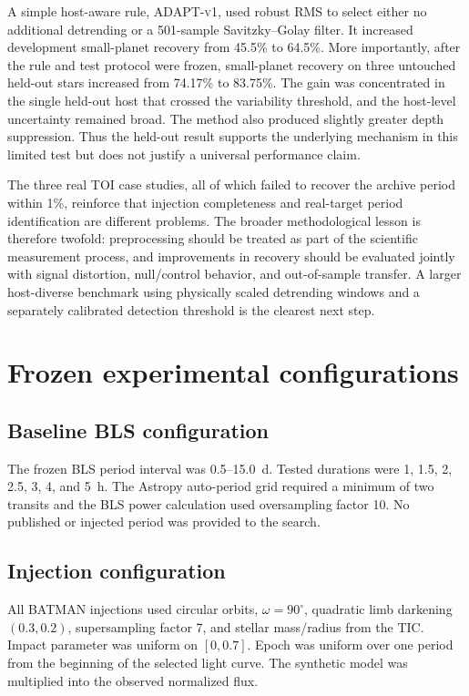 \documentclass[11pt]{article}
\newcommand{\adapt}{\textsc{ADAPT-v1}}
\begin{document}
A simple host-aware rule, \adapt, used robust RMS to select either no additional detrending or a 501-sample Savitzky--Golay filter. It increased development small-planet recovery from 45.5\% to 64.5\%. More importantly, after the rule and test protocol were frozen, small-planet recovery on three untouched held-out stars increased from 74.17\% to 83.75\%. The gain was concentrated in the single held-out host that crossed the variability threshold, and the host-level uncertainty remained broad. The method also produced slightly greater depth suppression. Thus the held-out result supports the underlying mechanism in this limited test but does not justify a universal performance claim.

The three real TOI case studies, all of which failed to recover the archive period within 1\%, reinforce that injection completeness and real-target period identification are different problems. The broader methodological lesson is therefore twofold: preprocessing should be treated as part of the scientific measurement process, and improvements in recovery should be evaluated jointly with signal distortion, null/control behavior, and out-of-sample transfer. A larger host-diverse benchmark using physically scaled detrending windows and a separately calibrated detection threshold is the clearest next step.

\clearpage
\appendix
\section{Frozen experimental configurations}
\subsection{Baseline BLS configuration}
The frozen BLS period interval was 0.5--15.0~d. Tested durations were 1, 1.5, 2, 2.5, 3, 4, and 5~h. The Astropy auto-period grid required a minimum of two transits and the BLS power calculation used oversampling factor 10. No published or injected period was provided to the search.

\subsection{Injection configuration}
All BATMAN injections used circular orbits, $\omega=90^\circ$, quadratic limb darkening $(0.3,0.2)$, supersampling factor 7, and stellar mass/radius from the TIC. Impact parameter was uniform on $[0,0.7]$. Epoch was uniform over one period from the beginning of the selected light curve. The synthetic model was multiplied into the observed normalized flux.
\end{document}
